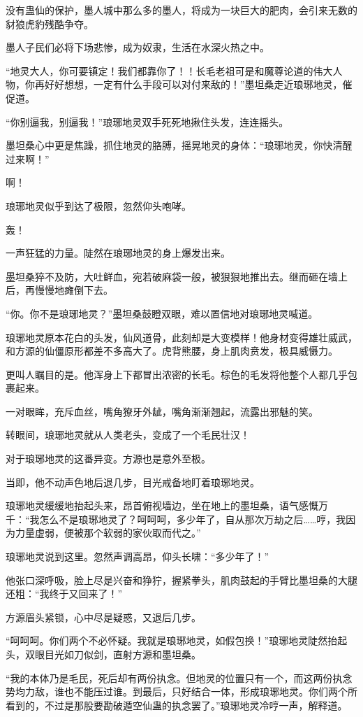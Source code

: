 \begin{this_body}
没有蛊仙的保护，墨人城中那么多的墨人，将成为一块巨大的肥肉，会引来无数的豺狼虎豹残酷争夺。

墨人子民们必将下场悲惨，成为奴隶，生活在水深火热之中。

“地灵大人，你可要镇定！我们都靠你了！！长毛老祖可是和魔尊论道的伟大人物，你再好好想想，一定有什么手段可以对付来敌的！”墨坦桑走近琅琊地灵，催促道。

“你别逼我，别逼我！”琅琊地灵双手死死地揪住头发，连连摇头。

墨坦桑心中更是焦躁，抓住地灵的胳膊，摇晃地灵的身体：“琅琊地灵，你快清醒过来啊！”

啊！

琅琊地灵似乎到达了极限，忽然仰头咆哮。

轰！

一声狂猛的力量。陡然在琅琊地灵的身上爆发出来。

墨坦桑猝不及防，大吐鲜血，宛若破麻袋一般，被狠狠地推出去。继而砸在墙上后，再慢慢地瘫倒下去。

“你。你不是琅琊地灵？”墨坦桑鼓瞪双眼，难以置信地对琅琊地灵喊道。

琅琊地灵原本花白的头发，仙风道骨，此刻却是大变模样！他身材变得雄壮威武，和方源的仙僵原形都差不多高大了。虎背熊腰，身上肌肉贲发，极具威慑力。

更叫人瞩目的是。他浑身上下都冒出浓密的长毛。棕色的毛发将他整个人都几乎包裹起来。

一对眼眸，充斥血丝，嘴角獠牙外龇，嘴角渐渐翘起，流露出邪魅的笑。

转眼间，琅琊地灵就从人类老头，变成了一个毛民壮汉！

对于琅琊地灵的这番异变。方源也是意外至极。

当即，他不动声色地后退几步，目光戒备地盯着琅琊地灵。

琅琊地灵缓缓地抬起头来，昂首俯视墙边，坐在地上的墨坦桑，语气感慨万千：“我怎么不是琅琊地灵了？呵呵呵，多少年了，自从那次万劫之后……哼，我因为力量虚弱，便被那个软弱的家伙取而代之。”

琅琊地灵说到这里。忽然声调高昂，仰头长啸：“多少年了！”

他张口深呼吸，脸上尽是兴奋和狰狞，握紧拳头，肌肉鼓起的手臂比墨坦桑的大腿还粗：“我终于又回来了！”

方源眉头紧锁，心中尽是疑惑，又退后几步。

“呵呵呵。你们两个不必怀疑。我就是琅琊地灵，如假包换！”琅琊地灵陡然抬起头，双眼目光如刀似剑，直射方源和墨坦桑。

“我的本体乃是毛民，死后却有两份执念。但地灵的位置只有一个，而这两份执念势均力敌，谁也不能压过谁。到最后，只好结合一体，形成琅琊地灵。你们两个所看到的，不过是那股要勘破遁空仙蛊的执念罢了。”琅琊地灵冷哼一声，解释道。


\end{this_body}

